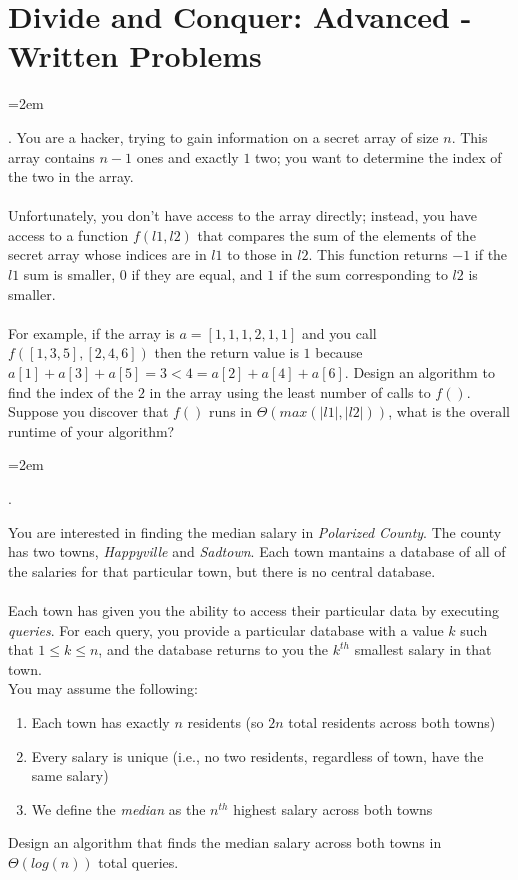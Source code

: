 \documentclass[12pt]{article}
\def\homework{Divide and Conquer: Advanced - Written Problems}
\newcounter{quesnum}
\newcommand{\question}[2][??]{
\begin{list}{\labelitemi}{\leftmargin=2em}
\item [\arabic{quesnum}.] {} {#2}
\end{list}
\addtocounter{quesnum}{1}
}
\begin{document}
\section*{\homework}


\question[3]{
You are a hacker, trying to gain information on a secret array of size $n$. This array contains $n-1$ ones and exactly $1$ two; you want to determine the index of the two in the array.\\
\\
Unfortunately, you don't have access to the array directly; instead, you have access to a function $f(l1, l2)$ that compares the sum of the elements of the secret array whose indices are in $l1$ to those in $l2$. This function returns $-1$ if the $l1$ sum is smaller, $0$ if they are equal, and $1$ if the sum corresponding to $l2$ is smaller.\\
\\
For example, if the array is $a=[1,1,1,2,1,1]$ and you call $f([1,3,5],[2,4,6])$ then the return value is $1$ because $a[1]+a[3]+a[5]=3<4=a[2]+a[4]+a[6]$. Design an algorithm to find the index of the $2$ in the array using the least number of calls to $f()$. Suppose you discover that $f()$ runs in $\Theta(max(|l1|,|l2|))$, what is the overall runtime of your algorithm? 
}



\question[3]{
You are interested in finding the median salary in \emph{Polarized County}. The county has two towns, \emph{Happyville} and \emph{Sadtown}. Each town mantains a database of all of the salaries for that particular town, but there is no central database.\\
\\
Each town has given you the ability to access their particular data by executing \emph{queries}. For each query, you provide a particular database with a value $k$ such that $1 \leq k \leq n$, and the database returns to you the $k^{th}$ smallest salary in that town.
\\
You may assume the following:

\begin{enumerate}
\item Each town has exactly $n$ residents (so $2n$ total residents across both towns)
\item Every salary is unique (i.e., no two residents, regardless of town, have the same salary) 
\item We define the \emph{median} as the $n^{th}$ highest salary across both towns
\end{enumerate}

Design an algorithm that finds the median salary across both towns in $\Theta(log(n))$ total queries.
}
\end{document}
